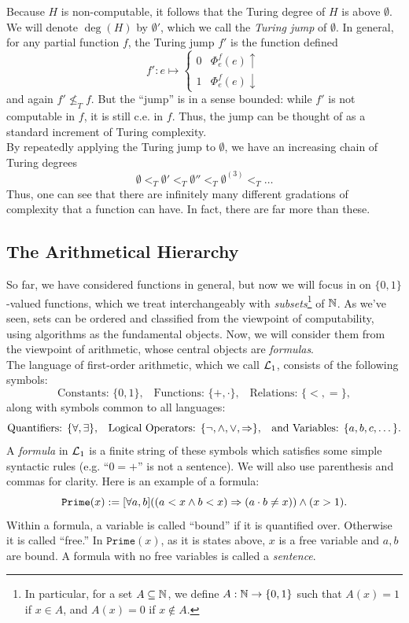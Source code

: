 \documentclass{amsart}
\begin{document}
	Because $H$ is non-computable, it follows that the Turing degree of $H$ is above $\emptyset$. We will denote $\deg(H)$ by $\emptyset'$, which we call the \textit{Turing jump} of $\emptyset$. In general, for any partial function $f$, the Turing jump $f'$ is the function defined
	$$
	f': e\mapsto \begin{cases}
		0 & \Phi_e^f(e)\uparrow \\
		1 & \Phi_e^f(e)\downarrow
	\end{cases}
	$$
	and again $f'\nleq_T f$. But the ``jump'' is in a sense bounded: while $f'$ is not computable in $f$, it is still c.e. in $f$. Thus, the jump can be thought of as a standard increment of Turing complexity.\\
	\indent By repeatedly applying the Turing jump to $\emptyset$, we have an increasing chain of Turing degrees
	$$
	\emptyset <_T \emptyset' <_T \emptyset'' <_T \emptyset^{(3)}<_T \dots 
	$$
	Thus, one can see that there are infinitely many different gradations of complexity that a function can have. In fact, there are far more than these.
	
	\subsection{The Arithmetical Hierarchy}
	
	So far, we have considered functions in general, but now we will focus in on $\{0,1\}$-valued functions, which we treat interchangeably with \textit{subsets}\footnote{In particular, for a set $A\subseteq \mathbb{N}$, we define $A:\mathbb{N}\to \{0,1\}$ such that $A(x)=1$ if $x\in A$, and $A(x)=0$ if $x\not\in A$.} of $\mathbb{N}$. As we've seen, sets can be ordered and classified from the viewpoint of computability, using algorithms as the fundamental objects. Now, we will consider them from the viewpoint of arithmetic, whose central objects are \textit{formulas}.\\
	\indent The language of first-order arithmetic, which we call $\mathcal{L}_1$, consists of the following symbols:
	$$
	\text{Constants: } \{0,1\}, \;\;\; \text{Functions: } \{+,\cdot\}, \;\;\; \text{Relations: } \{<,=\},
	$$
	along with symbols common to all languages:
	$$\text{Quantifiers: } \{\forall,\exists\}, \;\;\; \text{Logical Operators: }\{\neg,\wedge,\vee,\Rightarrow\}, \;\;\; \text{and Variables: }\{a,b,c,\dots\}. $$
	A \textit{formula} in $\mathcal{L}_1$ is a finite string of these symbols which satisfies some simple syntactic rules (e.g. ``$0=+$'' is not a sentence). We will also use parenthesis and commas for clarity. Here is an example of a formula:
	$$
	\mathtt{Prime}(x) := [\forall a,b] ((a< x \wedge b <x) \Rightarrow (a\cdot b \neq x)) \wedge (x > 1).
	$$
	Within a formula, a variable is called ``bound'' if it is quantified over. Otherwise it is called ``free.'' In $\mathtt{Prime}(x)$, as it is states above, $x$ is a free variable and $a,b$ are bound. A formula with no free variables is called a \textit{sentence}.\\
	
\end{document}
